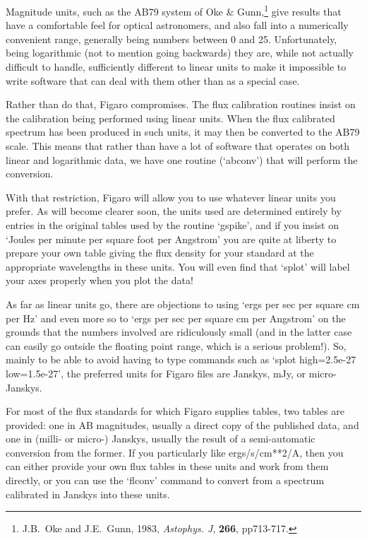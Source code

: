    Magnitude units, such as the AB79 system of Oke \&
   Gunn,\footnote{J.B.~Oke and J.E.~Gunn, 1983, {\it Astophys. J},
   {\bf 266}, pp713-717.} give
   results that have a comfortable feel for optical astronomers, and
   also fall into a numerically convenient range, generally being
   numbers between 0 and 25.  Unfortunately, being logarithmic (not to
   mention going backwards) they are, while not actually difficult to
   handle, sufficiently different to linear units to make it impossible
   to write software that can deal with them other than as a special
   case.

   Rather than do that, Figaro compromises.  The flux calibration
   routines insist on the calibration being performed using linear
   units.  When the flux calibrated spectrum has been produced in such
   units, it may then be converted to the AB79 scale.  This means that
   rather than have a lot of software that operates on both linear and
   logarithmic data, we have one routine (`abconv') that will perform
   the conversion.


   With that restriction, Figaro will allow you to use whatever linear
   units you prefer.  As will become clearer soon, the units used are
   determined entirely by entries in the original tables used by the
   routine `gspike', and if you insist on `Joules per minute per square
   foot per Angstrom' you are quite at liberty to prepare your own table
   giving the flux density for your standard at the appropriate
   wavelengths in these units.  You will even find that `splot' will
   label your axes properly when you plot the data!


   As far as linear units go, there are objections to using `ergs per
   sec per square cm per Hz' and even more so to `ergs per sec per
   square cm per Angstrom' on the grounds that the numbers involved are
   ridiculously small (and in the latter case can easily go outside the
   floating point range, which is a serious problem!).  So, mainly to be
   able to avoid having to type commands such as `splot high=2.5e-27
   low=1.5e-27', the preferred units for Figaro files are Janskys, mJy,
   or micro-Janskys.


   For most of the flux standards for which Figaro supplies tables, two
   tables are provided: one in AB magnitudes, usually a direct copy of
   the published data, and one in (milli- or micro-) Janskys, usually
   the result of a semi-automatic conversion from the former.  If you
   particularly like ergs/s/cm**2/A, then you can either provide your
   own flux tables in these units and work from them directly, or you
   can use the `flconv' command to convert from a spectrum calibrated in
   Janskys into these units.

